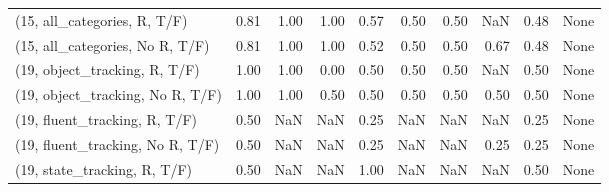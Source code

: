 \begin{table*}[h!]
\begin{adjustbox}{width=2\columnwidth,center}
\begin{tabular}{lrrr|rrr|rrr}
(15, all\_categories, R, T/F)          &                      0.81 &                  1.00 &                      1.00 &                          0.57 &                      0.50 &                          0.50 &                                    NaN &                               0.48 &                                  None \\
(15, all\_categories, No R, T/F)       &                      0.81 &                  1.00 &                      1.00 &                          0.52 &                      0.50 &                          0.50 &                                   0.67 &                               0.48 &                                  None \\



\midrule
(19, object\_tracking, R, T/F)         &                      1.00 &                  1.00 &                      0.00 &                          0.50 &                      0.50 &                          0.50 &                                    NaN &                               0.50 &                                  None \\
(19, object\_tracking, No R, T/F)      &                      1.00 &                  1.00 &                      0.50 &                          0.50 &                      0.50 &                          0.50 &                                   0.50 &                               0.50 &                                  None \\
(19, fluent\_tracking, R, T/F)         &                      0.50 &                   NaN &                       NaN &                          0.25 &                       NaN &                           NaN &                                    NaN &                               0.25 &                                  None \\
(19, fluent\_tracking, No R, T/F)      &                      0.50 &                   NaN &                       NaN &                          0.25 &                       NaN &                           NaN &                                   0.25 &                               0.25 &                                  None \\
(19, state\_tracking, R, T/F)          &                      0.50 &                   NaN &                       NaN &                          1.00 &                       NaN &                           NaN &                                    NaN &                               0.50 &                                  None \\

\end{tabular}
\end{adjustbox}
\end{table*}
